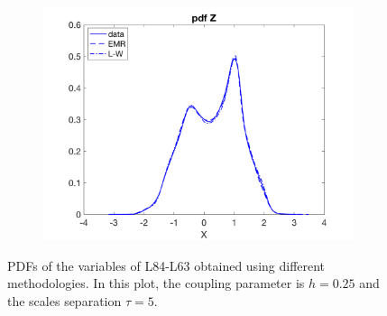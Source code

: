 \documentclass[12pt]{article}
\begin{document}
\begin{figure}[H]
\begin{subfigure}[b]{0.3\textwidth}
		\includegraphics[width=\textwidth]{plots/l84l63/pdfzl84025.png}
	\end{subfigure}
	\hfill
	\caption{PDFs of the variables of L84-L63 obtained using different methodologies. In this plot, the coupling parameter is $h=0.25$ and the scales separation $\tau = 5$.}
\end{figure}
\end{document}
